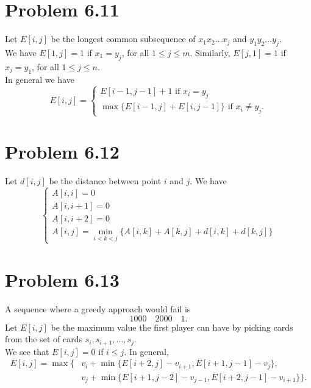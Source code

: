 \documentclass[12pt]{report}
\begin{document}
\section{Problem 6.11}
Let $E[i,j]$ be the longest common subsequence of $x_1 x_2 \ldots x_j$ and $y_1 y_2 \ldots y_j$. \\
We have $E[1,j] = 1$ if $x_1 = y_j$, for all $1 \le j \le m$. Similarly, $E[j,1] = 1$ if $x_j = y_1$, for all $1 \le j \le n$. \\
In general we have $$E[i,j] = \begin{cases} E[i-1,j-1] + 1 \text{ if } x_i = y_j \\ \max \{E[i-1,j] + E[i,j-1] \} \text{ if } x_i \ne y_j. \end{cases}$$

\section{Problem 6.12}
Let $d[i,j]$ be the distance between point $i$ and $j$. We have $$\begin{cases} A[i,i] = 0 \\ A[i, i + 1] = 0 \\ A[i, i+2] = 0 \\ A[i,j] = \displaystyle \min_{i < k < j} \{ A[i,k] + A[k,j] + d[i,k] + d[k,j]\} \end{cases}$$

\section{Problem 6.13}
A sequence where a greedy approach would fail is $$1000 \quad 2000 \quad 1.$$
Let $E[i,j]$ be the maximum value the first player can have by picking cards from the set of cards $s_i, s_{i+1}, \ldots, s_j$. \\
We see that $E[i,j] = 0$ if $i \le j$. In general, $$\begin{aligned} E[i,j] = \max\{ & v_i + \min \{ E[i + 2, j] - v_{i+1}, E[i + 1, j - 1] - v_j \}, \\ & v_j + \min \{ E[i+1,j-2] - v_{j-1}, E[i+2,j-1] - v_{i+1}\}\}. \end{aligned}$$
\end{document}
